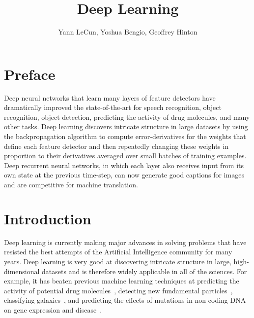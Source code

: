 \documentclass[]{article}
\title{Deep Learning}
\author{Yann LeCun, Yoshua Bengio, Geoffrey Hinton}
\begin{document}
\maketitle

\section{Preface}

Deep neural networks that learn many layers of feature detectors have
dramatically improved the state-of-the-art for speech recognition, object
recognition, object detection, predicting the activity of drug molecules,
and many other tasks. Deep learning discovers intricate structure in large
datasets by using the backpropagation algorithm to compute
error-derivatives for the weights that define each feature detector and
then repeatedly changing these weights in proportion to their derivatives
averaged over small batches of training examples.  Deep recurrent neural
networks, in which each layer also receives input from its own state at the
previous time-step, can now generate good captions for images and are
competitive for machine translation.

\section{Introduction}

Deep learning is currently making major advances in solving problems that
have resisted the best attempts of the Artificial Intelligence community
for many years. Deep learning is very good at discovering intricate
structure in large, high-dimensional datasets and is therefore widely
applicable in all of the sciences. For example, it has beaten previous
machine learning techniques at predicting the activity of potential drug
molecules~\citep{Dahl}, detecting new fundamental particles~\citep{particles},
classifying galaxies~\citep{??}, and predicting the effects of mutations in
non-coding DNA on gene expression and disease~\citep{Keung-et-al-2014}. %
\end{document}
